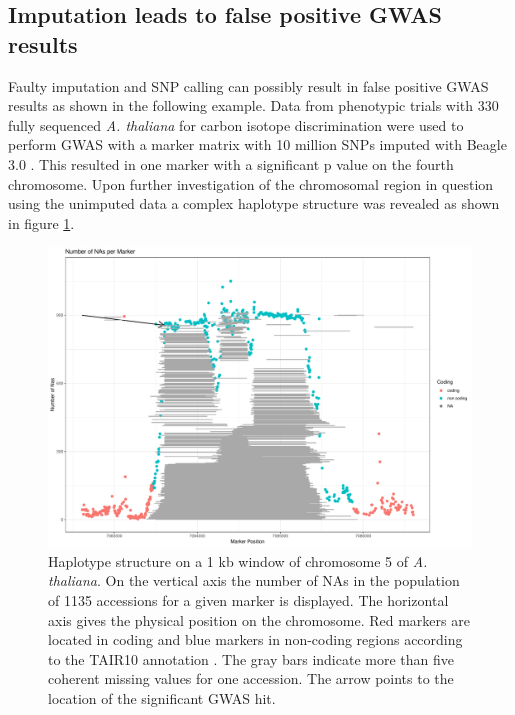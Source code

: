 \subsection{Imputation leads to false positive GWAS results}

Faulty imputation and SNP calling can possibly result in false positive GWAS results as
shown in the following example. Data from phenotypic trials with 330 fully sequenced
\textit{A. thaliana} for carbon isotope discrimination were used to perform GWAS with a
marker matrix with 10 million SNPs imputed with Beagle 3.0
\cite{dittberner2018natural}. This resulted in one marker with a significant p value on
the fourth chromosome. Upon further investigation of the chromosomal region in question
using the unimputed data a complex haplotype structure was revealed as shown in figure
\ref{fig:chr_jul}.

\begin{figure}[H]
\centering
\includegraphics[height=.55\textheight, width=1.1\textwidth]{Figures/plot_NAs_AT}
\decoRule
\caption[Haplotype structure on a 1kb window of chromosome 4 of
\textit{A. thaliana}]{Haplotype structure on a 1 kb window of chromosome 5 of
  \textit{A. thaliana}. On the vertical axis the number of NAs in the population of 1135
  accessions for a given marker is displayed. The horizontal axis gives the physical
  position on the chromosome. Red markers are located in coding and blue markers in
  non-coding regions according to the TAIR10 annotation \cite{rhee2003arabidopsis}. The
  gray bars indicate more than five coherent missing values for one accession. The arrow
  points to the location of the significant GWAS hit.}
\label{fig:chr_jul}
\end{figure}

